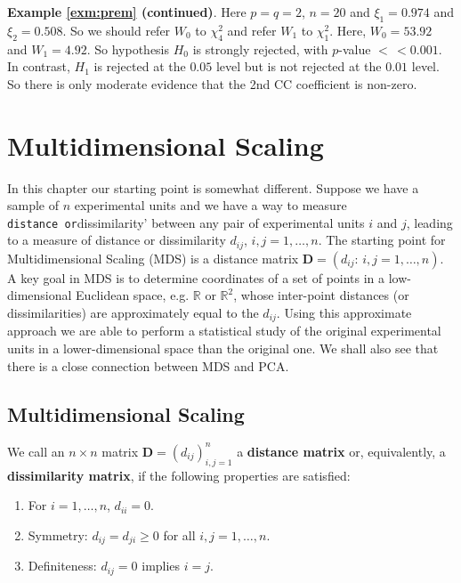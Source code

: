 \documentclass[]{book}
\providecommand{\tightlist}{%
  \setlength{\itemsep}{0pt}\setlength{\parskip}{0pt}}
\theoremstyle{definition}
\theoremstyle{definition}
\theoremstyle{definition}
\theoremstyle{remark}
\begin{document}
\textbf{Example \ref{exm:prem} (continued)}.
Here \(p=q=2\), \(n=20\) and \(\xi_1=0.974\) and \(\xi_2=0.508\).
So we should refer \(W_0\) to \(\chi_4^2\) and refer \(W_1\) to \(\chi_1^2\). Here, \(W_0=53.92\) and \(W_1=4.92\). So hypothesis \(H_0\) is strongly rejected, with \(p\)-value \(<\,<0.001\). In contrast, \(H_1\) is rejected at the \(0.05\) level but is not rejected at the \(0.01\) level. So there is only moderate evidence that the 2nd CC coefficient is non-zero.

\hypertarget{mds}{%
\chapter{Multidimensional Scaling}\label{mds}}

In this chapter our starting point is somewhat different. Suppose we have a sample of \(n\) experimental units
and we have a way to measure \texttt{distance\textquotesingle{}\ or}dissimilarity' between any pair of experimental units \(i\) and \(j\), leading to a measure of distance or dissimilarity \(d_{ij}\), \(i,j=1, \ldots , n\). The starting point for Multidimensional Scaling (MDS) is a distance matrix \(\boldsymbol D=(d_{ij}: \, i,j=1, \ldots , n)\). A key goal in MDS is to determine coordinates of a set of points in a low-dimensional Euclidean space, e.g. \(\mathbb{R}\) or \(\mathbb{R}^2\), whose inter-point distances (or dissimilarities) are approximately equal to the \(d_{ij}\). Using this approximate approach we are able to perform a statistical study of the original experimental units in a lower-dimensional space than the original one. We shall also see that there is a close connection between MDS and PCA.

\hypertarget{multidimensional-scaling}{%
\section{Multidimensional Scaling}\label{multidimensional-scaling}}

We call an \(n \times n\) matrix \(\boldsymbol D=(d_{ij})_{i,j=1}^n\) a \textbf{distance matrix} or, equivalently, a \textbf{dissimilarity matrix}, if the following properties are satisfied:

\begin{enumerate}
\def\labelenumi{\arabic{enumi}.}
\tightlist
\item
  For \(i=1, \ldots , n\), \(d_{ii}=0\).
\item
  Symmetry: \(d_{ij}=d_{ji} \geq 0\) for all \(i,j=1,\ldots, n\).
\item
  Definiteness: \(d_{ij}=0\) implies \(i=j\).
\end{enumerate}
\end{document}
